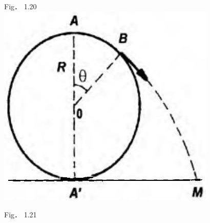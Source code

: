 \documentclass[10pt]{article}
\begin{document}
Fig． 1.20\\
\includegraphics[max width=\textwidth, center]{2025_07_01_5b3ff9fa0d508c8e9f17g-057}

Fig． 1.21
\end{document}
